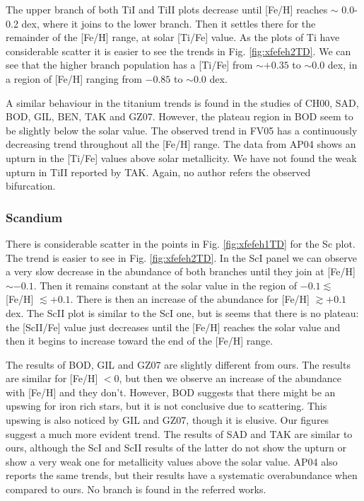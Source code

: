 \documentclass[oldversion]{aa}
\begin{document}
The upper branch of both TiI and TiII plots decrease until [Fe/H] reaches $\sim$ 0.0-0.2 dex, where it joins to the lower branch. Then it settles there for the remainder of the [Fe/H] range, at solar [Ti/Fe] value. As the plots of Ti have considerable scatter it is easier to see the trends in Fig. \ref{fig:xfefeh2TD}. We can see that the higher branch population has a [Ti/Fe] from $\sim +0.35$ to $\sim 0.0$ dex, in a region of [Fe/H] ranging from $-0.85$ to $\sim 0.0$ dex.

A similar behaviour in the titanium trends is found in the studies of CH00, SAD, BOD, GIL, BEN, TAK and GZ07. However, the plateau region in BOD seem to be slightly below the solar value. The observed trend in FV05 has a continuously decreasing trend throughout all the [Fe/H] range. The data from AP04 shows an upturn in the [Ti/Fe] values above solar metallicity. We have not found the weak upturn in TiII reported by TAK. Again, no author refers the observed bifurcation.


\subsubsection{Scandium}

There is considerable scatter in the points in Fig. \ref {fig:xfefeh1TD} for the Sc plot. The trend is easier to see in Fig. \ref {fig:xfefeh2TD}. In the ScI panel we can observe a very slow decrease in the abundance of both branches until they join at [Fe/H] $\sim -0.1$. Then it remains constant at the solar value in the region of $-0.1 \lesssim$ [Fe/H] $\lesssim +0.1$. There is then an increase of the abundance for [Fe/H] $\gtrsim +0.1$ dex. The ScII plot is similar to the ScI one, but is seems that there is no plateau: the [ScII/Fe] value just decreases until the [Fe/H] reaches the solar value and then it begins to increase toward the end of the [Fe/H] range.

The results of BOD, GIL and GZ07 are slightly different from ours. The results are similar for [Fe/H] $<0$, but then we observe an increase of the abundance with [Fe/H] and they don't. However, BOD suggests that there might be an upswing for iron rich stars, but it is not conclusive due to scattering. This upswing is also noticed by GIL and GZ07, though it is elusive. Our figures suggest a much more evident trend. The results of SAD and TAK are similar to ours, although the ScI and ScII results of the latter do not show the upturn or show a very weak one for metallicity values above the solar value. AP04 also reports the same trends, but their results have a systematic overabundance when compared to ours. No branch is found in the referred works.
\end{document}
